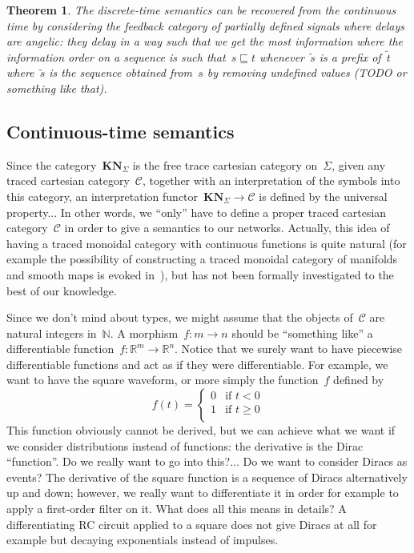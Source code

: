 \documentclass{article}
\newtheorem{theorem}{Theorem}
\newcommand{\N}{\mathbb{N}}
\newcommand{\R}{\mathbb{R}}
\newcommand{\category}[1]{\mathbf{#1}}
\newcommand{\KN}{\category{KN}}
\renewcommand{\C}{\mathcal{C}}
\begin{document}
\begin{theorem}
  The discrete-time semantics can be recovered from the continuous time by
  considering the feedback category of partially defined signals where delays
  are angelic: they delay in a way such that we get the most information where
  the information order on a sequence is such that~$s\sqsubseteq t$
  whenever~$\tilde{s}$ is a prefix of~$\tilde{t}$ where~$\tilde{s}$ is the
  sequence obtained from~$s$ by removing undefined values (TODO or something
  like that).
\end{theorem}

\subsection{Continuous-time semantics}
Since the category~$\KN_\Sigma$ is the free trace cartesian category
on~$\Sigma$, given any traced cartesian category~$\C$, together with an
interpretation of the symbols into this category, an interpretation
functor~$\KN_\Sigma\to\C$ is defined by the universal property... In other
words, we ``only'' have to define a proper traced cartesian category~$\C$ in
order to give a semantics to our networks. Actually, this idea of having a
traced monoidal category with continuous functions is quite natural (for example
the possibility of constructing a traced monoidal category of manifolds and
smooth maps is evoked in~\cite{abramsky1996retracing}), but has not been
formally investigated to the best of our knowledge.

Since we don't mind about types, we might assume that the objects of~$\C$ are
natural integers in~$\N$. A morphism~$f:m\to n$ should be ``something like'' a
differentiable function~$f:\R^m\to\R^n$. Notice that we surely want to have
piecewise differentiable functions and act as if they were differentiable. For
example, we want to have the square waveform, or more simply the function~$f$
defined by
\[
f(t)=
\begin{cases}
  0&\text{if $t<0$}\\
  1&\text{if $t\geq 0$}\\
\end{cases}
\]
This function obviously cannot be derived, but we can achieve what we want if we
consider distributions instead of functions: the derivative is the Dirac
``function''. Do we really want to go into this?... Do we want to consider
Diracs as events? The derivative of the square function is a sequence of Diracs
alternatively up and down; however, we really want to differentiate it in order
for example to apply a first-order filter on it. What does all this means in
details? A differentiating RC circuit applied to a square does not give Diracs
at all for example but decaying exponentials instead of impulses.
\end{document}
